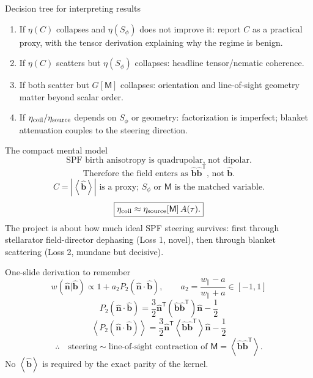 \documentclass[aspectratio=169]{beamer}
\newcommand{\bn}{\hat{\bm n}}
\newcommand{\bb}{\hat{\bm b}}
\newcommand{\T}{\mathsf T}
\newcommand{\avg}[1]{\left\langle #1 \right\rangle}
\newcommand{\Ptwo}{P_2}
\newcommand{\M}{\mathsf M}
\newcommand{\Sphi}{S_\phi}
\newcommand{\wpar}{w_\parallel}
\begin{document}
\begin{frame}[t]{Decision tree for interpreting results}
\begin{enumerate}
  \item If $\eta(C)$ collapses and $\eta(\Sphi)$ does not improve it: report $C$ as a practical proxy, with the tensor derivation explaining why the regime is benign.
  \item If $\eta(C)$ scatters but $\eta(\Sphi)$ collapses: headline tensor/nematic coherence.
  \item If both scatter but $G[\M]$ collapses: orientation and line-of-sight geometry matter beyond scalar order.
  \item If $\eta_{\rm coil}/\eta_{\rm source}$ depends on $\Sphi$ or geometry: factorization is imperfect; blanket attenuation couples to the steering direction.
\end{enumerate}
\end{frame}

\begin{frame}[t]{The compact mental model}
\[
\boxed{\text{SPF birth anisotropy is quadrupolar, not dipolar.}}
\]
\[
\boxed{\text{Therefore the field enters as }\bb\bb^\T\text{, not }\bb.}
\]
\[
\boxed{C=|\avg{\bb}|\text{ is a proxy; }\Sphi\text{ or }\M\text{ is the matched variable.}}
\]
\[
\boxed{\eta_{\rm coil}\approx \eta_{\rm source}[\M]\,A(\tau).}
\]
\vspace{0.5em}
The project is about how much ideal SPF steering survives: first through stellarator field-director dephasing (Loss 1, novel), then through blanket scattering (Loss 2, mundane but decisive).
\end{frame}

\begin{frame}[t]{One-slide derivation to remember}
\[
w(\bn|\bb)\propto 1+a_2\Ptwo(\bn\cdot\bb),
\qquad a_2=\frac{\wpar-a}{\wpar+a}\in[-1,1]
\]
\[
\Ptwo(\bn\cdot\bb)
=\frac{3}{2}\bn^\T(\bb\bb^\T)\bn-\frac{1}{2}
\]
\[
\avg{\Ptwo(\bn\cdot\bb)}
=\frac{3}{2}\bn^\T\avg{\bb\bb^\T}\bn-\frac{1}{2}
\]
\[
\therefore\quad
\text{steering}\sim \text{line-of-sight contraction of }\M=\avg{\bb\bb^\T}.
\]
No $\avg{\bb}$ is required by the exact parity of the kernel.
\end{frame}
\end{document}
